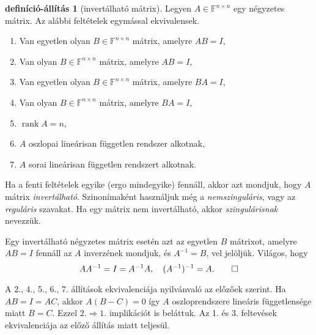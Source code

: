 \documentclass[9pt,showtrims]{memoir}
\makeatletter
\renewenvironment{proof}[1][\proofname]
    {\par\pushQED{\qed}%
    \normalfont \topsep6\p@\@plus6\p@\relax
    \trivlist
    \item[\hskip\labelsep
        \itshape
    #1\@addpunct{:}]\ignorespaces}
    {\popQED\endtrivlist\@endpefalse}
\theoremstyle{plain}
\theoremstyle{remark}
\theoremstyle{definition}
\newtheorem{defprop}[proposition]{definíció-állítás}
\DeclareMathOperator{\rank}{rank}
\makeatother
\begin{document}
\begin{defprop}[invertálható mátrix]
    Legyen $A\in\mathbb{F}^{n\times n}$ egy négyzetes mátrix.
    Az alábbi feltételek egymással ekvivalensek.
    \begin{enumerate}
        \item Van egyetlen olyan $B\in\mathbb{F}^{n\times n}$ mátrix,
            amelyre $AB=I$,
        \item Van olyan $B\in\mathbb{F}^{n\times n}$ mátrix,
            amelyre $AB=I$,
        \item Van egyetlen olyan $B\in\mathbb{F}^{n\times n}$ mátrix,
            amelyre $BA=I$,
        \item Van olyan $B\in\mathbb{F}^{n\times n}$ mátrix,
            amelyre $BA=I$,
        \item $\rank A=n$,
        \item $A$ oszlopai lineárisan független rendszer alkotnak,
        \item $A$ sorai lineárisan független rendszert alkotnak.
    \end{enumerate}
    Ha a fenti feltételek egyike (ergo mindegyike) fennáll, 
    akkor azt mondjuk, hogy $A$ mátrix \emph{invertálható}.
    Szinonímaként használjuk még a \emph{nemszinguláris}, 
    vagy az \emph{reguláris} szavakat.
    Ha egy mátrix nem invertálható, akkor \emph{szingulárisnak} nevezzük.

    Egy invertálható négyzetes mátrix esetén azt az egyetlen $B$ mátrixot, amelyre
    \(
        AB=I
    \)
    fennáll az $A$ inverzének mondjuk, és $A^{-1}=B$, vel jelöljük.
    Világos, hogy
\[
    AA^{-1}=I=A^{-1}A,\quad (A^{-1})^{-1}=A.\qedhere
\]
\end{defprop}
\begin{proof}
    A 2., 4., 5., 6., 7. állítások ekvivalenciája nyilvánvaló az előzőek szerint.
    Ha $AB=I=AC$, akkor $A\left( B-C \right)=0$ így $A$ oszloprendszere lineáris függetlensége 
    miatt $B=C$. 
    Ezzel $2.\Rightarrow 1.$ implikációt is beláttuk.
    Az 1. és 3. feltevések ekvivalenciája az előző állítás miatt teljesül.
\end{proof}
\end{document}
